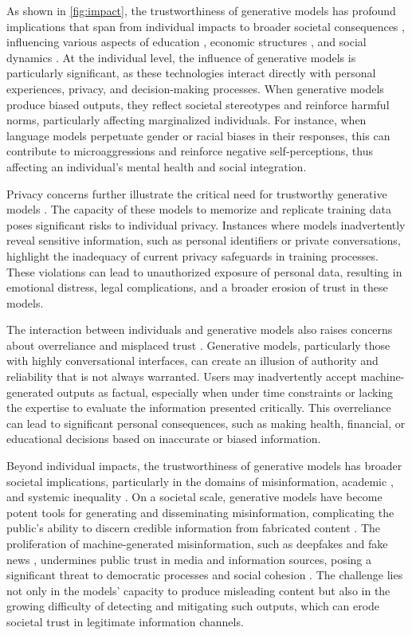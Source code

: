 As shown in \autoref{fig:impact}, the trustworthiness of generative models has profound implications that span from individual impacts to broader societal consequences \cite{wach2023dark}, influencing various aspects of education \cite{chiu2023impact}, economic structures \cite{chui2023economic}, and social dynamics \cite{baldassarre2023social}. At the individual level, the influence of generative models is particularly significant, as these technologies interact directly with personal experiences, privacy, and decision-making processes. When generative models produce biased outputs, they reflect societal stereotypes and reinforce harmful norms, particularly affecting marginalized individuals. For instance, when language models perpetuate gender or racial biases in their responses, this can contribute to microaggressions and reinforce negative self-perceptions, thus affecting an individual's mental health and social integration.

Privacy concerns further illustrate the critical need for trustworthy generative models \cite{novelli2024generative, chen2024generative}. The capacity of these models to memorize and replicate training data poses significant risks to individual privacy. Instances where models inadvertently reveal sensitive information, such as personal identifiers or private conversations, highlight the inadequacy of current privacy safeguards in training processes. These violations can lead to unauthorized exposure of personal data, resulting in emotional distress, legal complications, and a broader erosion of trust in these models.

The interaction between individuals and generative models also raises concerns about overreliance and misplaced trust \cite{10.1145/3630106.3658941}. Generative models, particularly those with highly conversational interfaces, can create an illusion of authority and reliability that is not always warranted. Users may inadvertently accept machine-generated outputs as factual, especially when under time constraints or lacking the expertise to evaluate the information presented critically. This overreliance can lead to significant personal consequences, such as making health, financial, or educational decisions based on inaccurate or biased information.

Beyond individual impacts, the trustworthiness of generative models has broader societal implications, particularly in the domains of misinformation, academic \citep{liang2024monitoring,geng2024chatgpt,geng2024impact}, and systemic inequality \cite{korinek2023generative}. On a societal scale, generative models have become potent tools for generating and disseminating misinformation, complicating the public’s ability to discern credible information from fabricated content \cite{huang2023harnessing}. The proliferation of machine-generated misinformation, such as deepfakes and fake news \cite{lyu2024deepfake}, undermines public trust in media and information sources, posing a significant threat to democratic processes and social cohesion \cite{chencombating}. The challenge lies not only in the models' capacity to produce misleading content but also in the growing difficulty of detecting and mitigating such outputs, which can erode societal trust in legitimate information channels.

